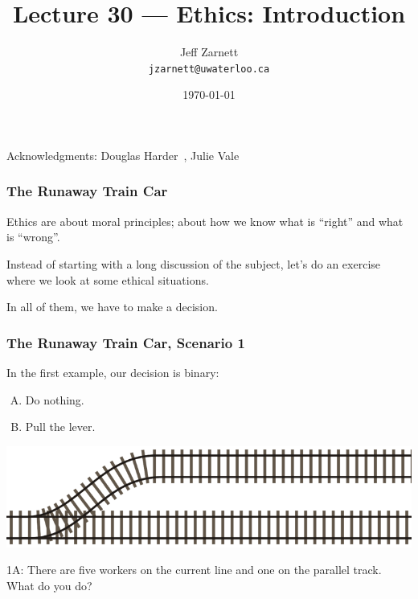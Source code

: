 

\title{Lecture 30 --- Ethics: Introduction }

\author{Jeff Zarnett \\ \small \texttt{jzarnett@uwaterloo.ca}}
\date{\today}




\begin{frame}
  \titlepage

\begin{center}
  \small{Acknowledgments: Douglas Harder~\cite{dwh}, Julie Vale~\cite{jv}}
  \end{center}
\end{frame}



\begin{frame}
\frametitle{The Runaway Train Car}

Ethics are about moral principles; about how we know what is ``right'' and what is ``wrong''. 

Instead of starting with a long discussion of the subject, let's do an exercise where we look at some ethical situations. 

In all of them, we have to make a decision.

\end{frame}



\begin{frame}
\frametitle{The Runaway Train Car, Scenario 1}


In the first example, our decision is binary:\\

\begin{enumerate}[A.]
	\item Do nothing.
	\item Pull the lever.
\end{enumerate}

\begin{center}
	\includegraphics[width=\textwidth]{images/crazytrain}
\end{center}


1A: There are five workers on the current line and one on the parallel track.\\
\quad What do you do?

\end{frame}

